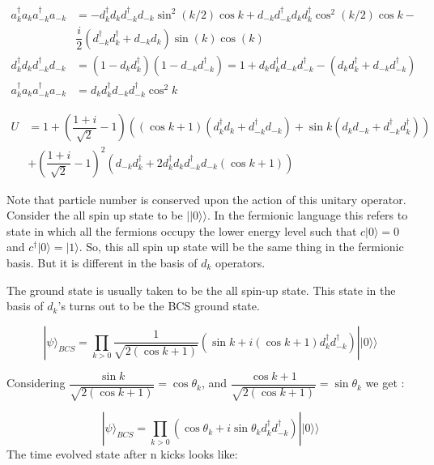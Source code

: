 \documentclass[11pt,a4paper]{article}
\begin{document}
		\begin{align*}
		a_{k}^\dagger a _{k} a_{-k}^\dagger a_{-k} &= -d_{k}^\dagger d _{k} d_{-k}^\dagger d_{-k} \sin^2(k/2)\cos k + d_{-k}d_{-k}^\dagger d_{k}d_{k}^\dagger \cos^2(k/2)\cos k-\\
		&\dfrac{i}{2}(d_{-k}^\dagger d_{k}^\dagger + d_{-k}d_{k})\sin(k)\cos(k) \\
		 d_{k}^\dagger d _{k} d_{-k}^\dagger d_{-k} &= (1-d_{k}d_{k}^\dagger)(1-d_{-k}d_{-k}^\dagger) = 1 + d_{k}d_{k}^\dagger d_{-k}d_{-k}^\dagger - (d_{k}d_{k}^\dagger + d_{-k}d_{-k}^\dagger)\\
a_{k}^\dagger a _{k} a_{-k}^\dagger a_{-k} &= 	d_{k}d_{k}^\dagger d_{-k}d_{-k}^\dagger \cos^2k	 
		\end{align*}
	
		
		\begin{align}\label{unitaryfinal}
		U &= 1 + (\dfrac{1+i}{\sqrt{2}}-1)((\cos k + 1 )(d_{k}^\dagger d_{k} + d_{-k}^\dagger d_{-k})+ \sin k(d_{k}d_{-k} + d_{-k}^\dagger d_{k}^\dagger )) \\&+ (\dfrac{1+i}{\sqrt{2}} -1)^2 (d_{-k}d_{k}^\dagger + 2 d_{k}^\dagger d_{k}d_{-k}^\dagger d_{-k}(\cos k +1 ))
		\end{align}
				
		Note that particle number is conserved upon the action of this unitary operator. Consider the all spin up state to be $||0\rangle \rangle$. In the fermionic language this refers to state in which all the fermions occupy the lower energy level such that $c|0\rangle = 0$ and $c^\dagger |0\rangle = |1\rangle$. So, this all spin up state will be the same thing in the fermionic basis. But it is different in the basis of $d_{k}$	operators. 
		
		The ground state is usually taken to be the all spin-up state. This state in the basis of $d_{k}$'s turns out to be the BCS ground state.
		
		\begin{equation}
		|\psi\rangle_{BCS} = \prod_{k>0}\dfrac{1}{ \sqrt{2(\cos k+1) }} (\sin k + i (\cos k +1 )d_{k}^\dagger d_{-k}^\dagger)||0\rangle \rangle
		\end{equation}
		
		Considering $\dfrac{\sin k}{\sqrt{2(\cos k + 1)}}  = \cos\theta_{k}$, and $\dfrac{\cos k + 1}{\sqrt{2(\cos k +1 )}} = \sin \theta_{k}$ we get : 
		
		\begin{equation}
		|\psi\rangle_{BCS} = \prod_{k>0} (\cos\theta_{k} + i \sin\theta_{k}d_{k}^\dagger d_{-k}^\dagger)||0\rangle\rangle
		\end{equation}
		 The time evolved state after n kicks looks like:
		 
\end{document}
